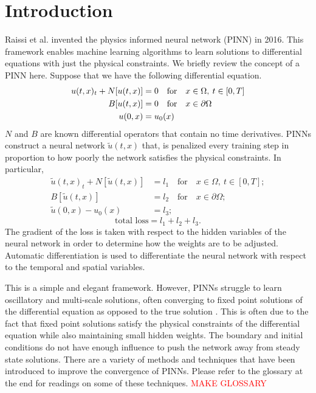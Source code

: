 \documentclass[12pt]{article}
\def\~{\tilde}
\begin{document}
\vfill
\newpage
\section{Introduction}

Raissi et al. \cite{pinns} invented the physics informed neural network (PINN) in 2016. This framework enables machine learning algorithms to learn solutions to differential equations with just the physical constraints. We briefly review the concept of a PINN here. Suppose that we have the following differential equation.
\begin{align} 
	u(t,x)_t + N[u(t,x)] &= 0 \quad \text{for} \quad x \in \Omega, \: t \in [0,T] \notag\\
	B[u(t,x)] &= 0 \quad \text{for} \quad x \in \partial \Omega\\
	u(0,x) &= u_0(x) \notag
\end{align} \label{eq:dq}
$N$ and $B$ are known differential operators that contain no time derivatives. PINNs construct a neural network $\~u(t,x)$ that, is penalized every training step in proportion to how poorly the network satisfies the physical constraints. In particular,
\begin{align*}
	\~u(t,x)_t + N[\~u(t,x)] &= l_1 \quad \text{for} \quad x \in \Omega, \: t \in [0,T];\\
	B[\~u(t,x)] &= l_2 \quad \text{for} \quad x \in \partial \Omega;\\
	\~u(0,x) - u_0(x)& = l_3;
\end{align*}
\begin{equation*}
\text{total loss} = l_1 + l_2 + l_3.
\end{equation*}
\noindent The gradient of the loss is taken with respect to the hidden variables of the neural network in order to determine how the weights are to be adjusted. Automatic differentiation is used to differentiate the neural network with respect to the temporal and spatial variables. 
\par This is a simple and elegant framework. However, PINNs struggle to learn oscillatory and multi-scale solutions, often converging to fixed point solutions of the differential equation as opposed to the true solution \cite{fixedpts}. This is often due to the fact that fixed point solutions satisfy the physical constraints of the differential equation while also maintaining small hidden weights. The boundary and initial conditions do not have enough influence to push the network away from steady state solutions. There are a variety of methods and techniques that have been introduced to improve the convergence of PINNs. Please refer to the glossary at the end for readings on some of these techniques. \textcolor{red}{MAKE GLOSSARY} 
\end{document}
